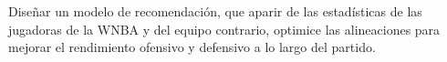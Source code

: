Diseñar un modelo de recomendación, que aparir de las estadísticas de las jugadoras de la WNBA y
del equipo contrario, optimice las alineaciones para mejorar el rendimiento ofensivo y defensivo a lo
largo del partido.